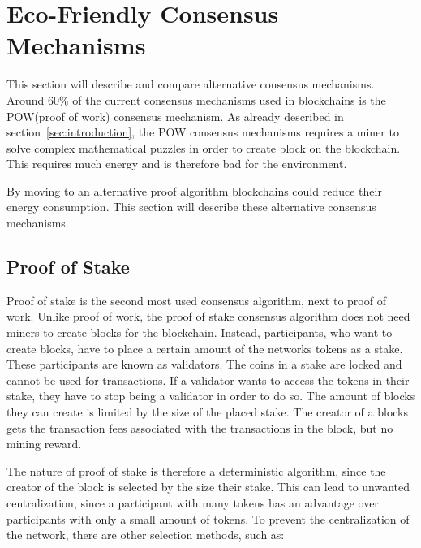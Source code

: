 

\section{Eco-Friendly Consensus Mechanisms}\label{sec:eco-friendly-consensus-mechanisms}
This section will describe and compare alternative consensus mechanisms.
Around 60\% of the current consensus mechanisms used in blockchains is the POW(proof of work) consensus mechanism.
As already described in section\ \ref{sec:introduction}, the POW consensus mechanisms requires a miner to solve complex mathematical puzzles in order to create block on the blockchain.
This requires much energy and is therefore bad for the environment.\cite{overview-of-sustainablity-blockchains,moralis-pow-enery-consumption}

By moving to an alternative proof algorithm blockchains could reduce their energy consumption.
This section will describe these alternative consensus mechanisms.\cite{4-ways-to-counter-blockchains-energy-consumption}

\subsection{Proof of Stake}\label{subsec:proof-of-stake}
Proof of stake is the second most used consensus algorithm, next to proof of work.
Unlike proof of work, the proof of stake consensus algorithm does not need miners to create blocks for the blockchain.
Instead, participants, who want to create blocks, have to place a certain amount of the networks tokens as a stake.
These participants are known as validators.
The coins in a stake are locked and cannot be used for transactions.
If a validator wants to access the tokens in their stake, they have to stop being a validator in order to do so.
The amount of blocks they can create is limited by the size of the placed stake.
The creator of a blocks gets the transaction fees associated with the transactions in the block, but no mining reward.\cite{bitpanda-pos}

The nature of proof of stake is therefore a deterministic algorithm, since the creator of the block is selected by the size their stake.
This can lead to unwanted centralization, since a participant with many tokens has an advantage over participants with only a small amount of tokens.
To prevent the centralization of the network, there are other selection methods, such as:

